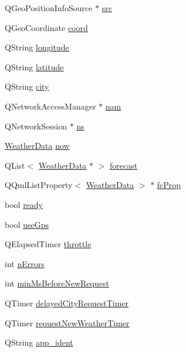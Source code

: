 \begin{DoxyCompactItemize}
\item 
Q\+Geo\+Position\+Info\+Source $\ast$ \hyperlink{class_app_model_private_a6f5f4021a335ff82b19cc9c5ed4d19a7}{src}
\item 
Q\+Geo\+Coordinate \hyperlink{class_app_model_private_a6ce8f938ce4197f9a2d1a5fdf90687d7}{coord}
\item 
Q\+String \hyperlink{class_app_model_private_a369e6197bd552c528a947c6e3ad3000e}{longitude}
\item 
Q\+String \hyperlink{class_app_model_private_a452f47a16e99adf64227449878d289a8}{latitude}
\item 
Q\+String \hyperlink{class_app_model_private_a9a1ea4d9c7b777128bb9180c0cb460a2}{city}
\item 
Q\+Network\+Access\+Manager $\ast$ \hyperlink{class_app_model_private_a1f605297f1e16880a2dd0ccbc7b8119f}{nam}
\item 
Q\+Network\+Session $\ast$ \hyperlink{class_app_model_private_a85e7bb4817c205ee9abb8fc03af9e7ef}{ns}
\item 
\hyperlink{class_weather_data}{Weather\+Data} \hyperlink{class_app_model_private_adacce6c96a2a7b0b825586a63a15bcac}{now}
\item 
Q\+List$<$ \hyperlink{class_weather_data}{Weather\+Data} $\ast$ $>$ \hyperlink{class_app_model_private_a4a0ab8ebb3742361ce643075cdb1baac}{forecast}
\item 
Q\+Qml\+List\+Property$<$ \hyperlink{class_weather_data}{Weather\+Data} $>$ $\ast$ \hyperlink{class_app_model_private_a2de18f475201900df044dffb35c64347}{fc\+Prop}
\item 
bool \hyperlink{class_app_model_private_ab0434f387adadf9ed65183496fe80f77}{ready}
\item 
bool \hyperlink{class_app_model_private_a7cb7a05c8aa13c53f2089c9d1859fa9c}{use\+Gps}
\item 
Q\+Elapsed\+Timer \hyperlink{class_app_model_private_af7465b76b5114594317cfe0528911ccf}{throttle}
\item 
int \hyperlink{class_app_model_private_aca2424002aea4928103c0af419b0152f}{n\+Errors}
\item 
int \hyperlink{class_app_model_private_a94421ad102edc6fdac2187201fcc3511}{min\+Ms\+Before\+New\+Request}
\item 
Q\+Timer \hyperlink{class_app_model_private_aa42651b04c201eaa24ef5c86a67f4b42}{delayed\+City\+Request\+Timer}
\item 
Q\+Timer \hyperlink{class_app_model_private_ad073c8bcf6739fd658009860e12aa72c}{request\+New\+Weather\+Timer}
\item 
Q\+String \hyperlink{class_app_model_private_a5441fbeeb55ca91647be56e38105d690}{app\+\_\+ident}
\end{DoxyCompactItemize}
